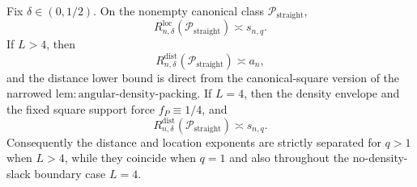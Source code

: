 Fix \(\delta\in(0,1/2)\).  On the nonempty canonical class \(\mathcal P_{\mathrm{straight}}\),
\[
 R_{n,\delta}^{\mathrm{loc}}(\mathcal P_{\mathrm{straight}})\asymp s_{n,q}.
\]
If \(L>4\), then
\[
 R_{n,\delta}^{\mathrm{dist}}(\mathcal P_{\mathrm{straight}})\asymp a_n,
\]
and the distance lower bound is direct from the canonical-square version of the narrowed \(\mathrm{lem:angular\text{-}density\text{-}packing}\).  If \(L=4\), then the density envelope and the fixed square support force \(f_P\equiv1/4\), and
\[
 R_{n,\delta}^{\mathrm{dist}}(\mathcal P_{\mathrm{straight}})\asymp s_{n,q}.
\]
Consequently the distance and location exponents are strictly separated for \(q>1\) when \(L>4\), while they coincide when \(q=1\) and also throughout the no-density-slack boundary case \(L=4\).